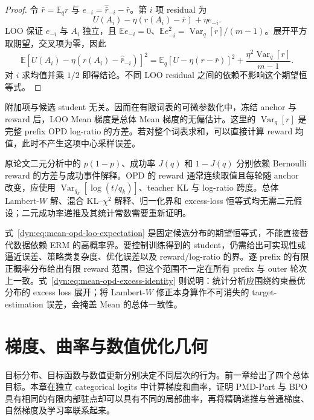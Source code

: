\documentclass[lang=cn,scheme=chinese,openany]{../book/elegantbook}
\newcommand{\E}{\mathbb E}
\newcommand{\Var}{\operatorname{Var}}
\begin{document}
\begin{proof}
令 $\bar r=\E_qr$ 与 $e_{-i}=\widehat{\bar r}_{-i}-\bar r$。第 $i$ 项 residual 为
\begin{equation*}
 U(A_i)-\eta(r(A_i)-\bar r)+\eta e_{-i}.
\end{equation*}
LOO 保证 $e_{-i}$ 与 $A_i$ 独立，且 $\E e_{-i}=0$、$\E e_{-i}^2=\Var_q[r]/(m-1)$。展开平方取期望，交叉项为零，因此
\begin{equation*}
 \E\left[U(A_i)-\eta(r(A_i)-\widehat{\bar r}_{-i})\right]^2
 =\E_q[U-\eta(r-\bar r)]^2
  +\frac{\eta^2\Var_q[r]}{m-1}.
\end{equation*}
对 $i$ 求均值并乘 $1/2$ 即得结论。不同 LOO residual 之间的依赖不影响这个期望恒等式。
\end{proof}

附加项与候选 student 无关。因而在有限词表的可微参数化中，冻结 anchor 与 reward 后，LOO Mean 梯度是总体 Mean 梯度的无偏估计。这里的 $\Var_q[r]$ 是完整 prefix OPD log-ratio 的方差。若对整个词表求和，可以直接计算 reward 均值，此时不产生这项中心采样误差。

原论文二元分析中的 $p(1-p)$、成功率 $J(q)$ 和 $1-J(q)$ 分别依赖 Bernoulli reward 的方差与成功事件解释。OPD 的 reward 通常连续取值且每轮随 anchor 改变，应使用 $\Var_{q_k}[\log(t/q_k)]$、teacher KL 与 log-ratio 跨度。总体 Lambert-$W$ 解、混合 KL--$\chi^2$ 解释、归一化界和 excess-loss 恒等式均无需二元假设；二元成功率递推及其统计常数需要重新证明。

式~\eqref{dyn:eq:mean-opd-loo-expectation} 是固定候选分布的期望恒等式，不能直接替代数据依赖 ERM 的高概率界。要控制训练得到的 student，仍需给出可实现性或逼近误差、策略类复杂度、优化误差以及 reward/log-ratio 的界。逐 prefix 的有限正概率分布给出有限 reward 范围，但这个范围不一定在所有 prefix 与 outer 轮次上一致。式~\eqref{dyn:eq:mean-opd-excess-identity} 则说明：统计分析应围绕约束最优分布的 excess loss 展开；将 Lambert-$W$ 修正本身算作不可消失的 target-estimation 误差，会掩盖 Mean 的总体一致性。





\chapter{梯度、曲率与数值优化几何}
\label{ch:geometry}
目标分布、目标函数与数值更新分别决定不同层次的行为。前一章给出了四个总体目标。本章在独立 categorical logits 中计算梯度和曲率，证明 PMD-Part 与 BPO 具有相同的有限内部驻点却可以具有不同的局部曲率，再将精确递推与普通梯度、自然梯度及学习率联系起来。
\end{document}
